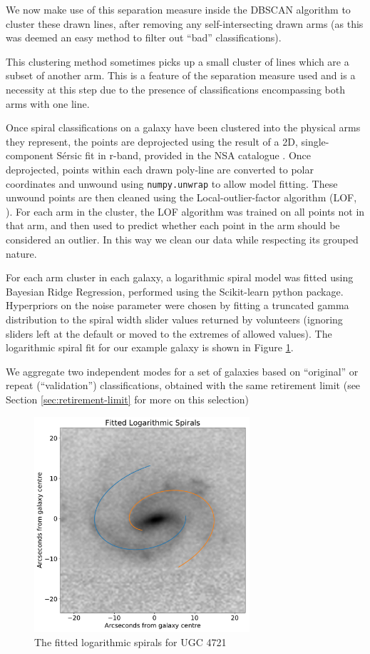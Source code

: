\documentclass[../main.tex]{subfiles}
\begin{document}
We now make use of this separation measure inside the DBSCAN algorithm to cluster these drawn lines, after removing any self-intersecting drawn arms (as this was deemed an easy method to filter out ``bad'' classifications).

This clustering method sometimes picks up a small cluster of lines which are a subset of another arm. This is a feature of the separation measure used and is a necessity at this step due to the presence of classifications encompassing both arms with one line.

Once spiral classifications on a galaxy have been clustered into the physical arms they represent, the points are deprojected using the result of a 2D, single-component S\'ersic fit in r-band, provided in the NSA catalogue \citep{2011AJ....142...31B}. Once deprojected, points within each drawn poly-line are converted to polar coordinates and unwound using \texttt{numpy.unwrap} to allow model fitting. These unwound points are then cleaned using the Local-outlier-factor algorithm (LOF, \citealt{local-outlier-factor}). For each arm in the cluster, the LOF algorithm was trained on all points not in that arm, and then used to predict whether each point in the arm should be considered an outlier. In this way we clean our data while respecting its grouped nature.

For each arm cluster in each galaxy, a logarithmic spiral model was fitted using Bayesian Ridge Regression, performed using the Scikit-learn python package. Hyperpriors on the noise parameter were chosen by fitting a truncated gamma distribution to the spiral width slider values returned by volunteers (ignoring sliders left at the default or moved to the extremes of allowed values). The logarithmic spiral fit for our example galaxy is shown in Figure \ref{fig:log_spirals}.

We aggregate two independent modes for a set of galaxies based on ``original'' or repeat (``validation'') classifications, obtained with the same retirement limit (see Section \ref{sec:retirement-limit} for more on this selection)

\begin{figure}
  \includegraphics[width=8cm]{images__method/log_spirals.pdf}
  \caption{The fitted logarithmic spirals for UGC 4721}
  \label{fig:log_spirals}
\end{figure}
\end{document}
